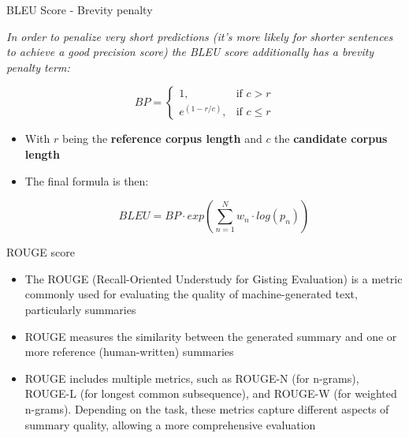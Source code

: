 
\begin{vbframe}{BLEU Score - Brevity penalty}

\textit{In order to penalize very short predictions (it's more likely for shorter sentences to achieve a good precision score) the BLEU score additionally has a brevity penalty term:}

\hspace{}

$$
  BP=\begin{cases}
    1, & \text{if $c>r$}\\
    e^{(1-r/c)}, & \text{if $c\leq r$}
  \end{cases}
$$

\hspace{}

\begin{itemize}
    \item With $r$ being the \textbf{reference corpus length} and $c$ the \textbf{candidate corpus length}
    \item The final formula is then:

$$BLEU = BP \cdot exp\left(\sum_{n=1}^{N}w_n\cdot log(p_n)\right)$$
\end{itemize}
    
\end{vbframe}



\begin{vbframe}{ROUGE score}

\vfill

\begin{itemize}
    \item The ROUGE (Recall-Oriented Understudy for Gisting Evaluation) is a metric commonly used for evaluating the quality of machine-generated text, particularly summaries
    \item ROUGE measures the similarity between the generated summary and one or more reference (human-written) summaries
    \item ROUGE includes multiple metrics, such as ROUGE-N (for n-grams), ROUGE-L (for longest common subsequence), and ROUGE-W (for weighted n-grams). Depending on the task, these metrics capture different aspects of summary quality, allowing a more comprehensive evaluation
\end{itemize}

\vfill
    
\end{vbframe}



